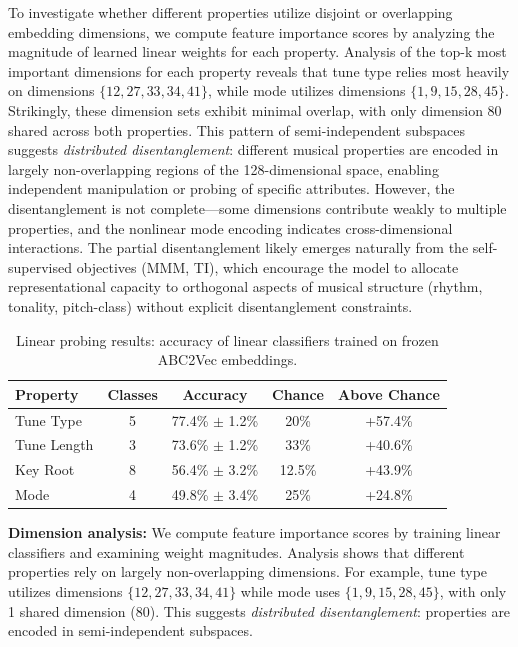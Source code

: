 \documentclass[]{interact}
\theoremstyle{plain}
\theoremstyle{definition}
\theoremstyle{remark}
\begin{document}
To investigate whether different properties utilize disjoint or overlapping embedding dimensions, we compute feature importance scores by analyzing the magnitude of learned linear weights for each property. Analysis of the top-k most important dimensions for each property reveals that tune type relies most heavily on dimensions $\{12, 27, 33, 34, 41\}$, while mode utilizes dimensions $\{1, 9, 15, 28, 45\}$. Strikingly, these dimension sets exhibit minimal overlap, with only dimension 80 shared across both properties. This pattern of semi-independent subspaces suggests \textit{distributed disentanglement}: different musical properties are encoded in largely non-overlapping regions of the 128-dimensional space, enabling independent manipulation or probing of specific attributes. However, the disentanglement is not complete---some dimensions contribute weakly to multiple properties, and the nonlinear mode encoding indicates cross-dimensional interactions. The partial disentanglement likely emerges naturally from the self-supervised objectives (MMM, TI), which encourage the model to allocate representational capacity to orthogonal aspects of musical structure (rhythm, tonality, pitch-class) without explicit disentanglement constraints.

\begin{table}[!htb]
\centering
\caption{Linear probing results: accuracy of linear classifiers trained on frozen ABC2Vec embeddings.}
\label{tab:probing}
\begin{tabular}{lcccc}
\toprule
\textbf{Property} & \textbf{Classes} & \textbf{Accuracy} & \textbf{Chance} & \textbf{Above Chance} \\
\midrule
Tune Type & 5 & 77.4\% $\pm$ 1.2\% & 20\% & +57.4\% \\
Tune Length & 3 & 73.6\% $\pm$ 1.2\% & 33\% & +40.6\% \\
Key Root & 8 & 56.4\% $\pm$ 3.2\% & 12.5\% & +43.9\% \\
Mode & 4 & 49.8\% $\pm$ 3.4\% & 25\% & +24.8\% \\
\bottomrule
\end{tabular}
\end{table}

\textbf{Dimension analysis:} We compute feature importance scores by training linear classifiers and examining weight magnitudes. Analysis shows that different properties rely on largely non-overlapping dimensions. For example, tune type utilizes dimensions $\{12, 27, 33, 34, 41\}$ while mode uses $\{1, 9, 15, 28, 45\}$, with only 1 shared dimension (80). This suggests \textit{distributed disentanglement}: properties are encoded in semi-independent subspaces.
\end{document}
